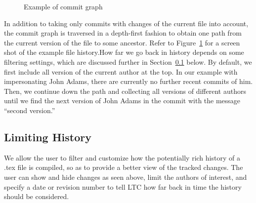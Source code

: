 \begin{figure}[t]
\centering
{}
\caption{Example of commit graph} \label{fig:commit-graph}
\end{figure}
In addition to taking only commits with changes of the current file into account, the commit graph is traversed in a depth-first fashion to obtain one path from the current version of the file to some ancestor.  Refer to Figure~\ref{fig:commit-graph} for a screen shot of the example file history.How far we go back in history depends on some filtering settings, which are discussed further in Section~\ref{sec:limit-history} below.  By default, we first include all version of the current author at the top.  In our example with impersonating John Adams, there are currently no further recent commits of him.  Then, we continue down the path and collecting all versions of different authors until we find the next version of John Adams in the commit with the message ``second version.''


\subsection{Limiting History} \label{sec:limit-history}

We allow the user to filter and customize how the potentially rich history of a .tex file is compiled, so as to provide a better view of the tracked changes.  The user can show and hide changes as seen above, limit the authors of interest, and specify a date or revision number to tell LTC how far back in time the history should be considered.


